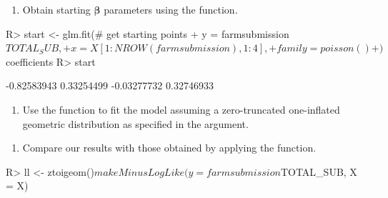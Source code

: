 \documentclass[
]{jss}
\providecommand{\tightlist}{%
  \setlength{\itemsep}{0pt}\setlength{\parskip}{0pt}}
\newcommand{\1}{\mathcal{I}} \newcommand{\bZero}{\boldsymbol{0}}
\begin{document}
\begin{enumerate}
\def\labelenumi{\arabic{enumi}.}
\setcounter{enumi}{2}
\tightlist
\item
  Obtain starting \(\boldsymbol{\beta}\) parameters using the
   function.
\end{enumerate}

\begin{CodeChunk}
\begin{CodeInput}
R> start <- glm.fit(# get starting points
+   y = farmsubmission$TOTAL_SUB, 
+   x = X[1:NROW(farmsubmission), 1:4], 
+   family = poisson()
+ )$coefficients
R> start
\end{CodeInput}
\begin{CodeOutput}
[1] -0.82583943  0.33254499 -0.03277732  0.32746933
\end{CodeOutput}
\end{CodeChunk}

\begin{enumerate}
\def\labelenumi{\arabic{enumi}.}
\setcounter{enumi}{3}
\tightlist
\item
  Use the  function to fit the model assuming a
  zero-truncated one-inflated geometric distribution as specified in the
   argument.
\end{enumerate}

\begin{CodeChunk}
\end{CodeChunk}

\begin{enumerate}
\def\labelenumi{\arabic{enumi}.}
\setcounter{enumi}{4}
\tightlist
\item
  Compare our results with those obtained by applying the
   function.
\end{enumerate}

\begin{CodeChunk}
\begin{CodeInput}
R> ll <- ztoigeom()$makeMinusLogLike(y = farmsubmission$TOTAL_SUB, X = X)
\end{CodeInput}
\end{CodeChunk}
\end{document}
